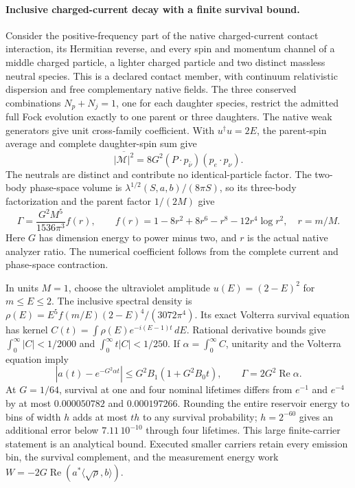 \paragraph{Inclusive charged-current decay with a finite survival bound.}
Consider the positive-frequency part of the native charged-current contact
interaction, its Hermitian reverse, and every spin and momentum channel of
a middle charged particle, a lighter charged particle and two distinct
massless neutral species. This is a declared contact member, with continuum
relativistic dispersion and free complementary native fields. The three
conserved combinations $N_p+N_j=1$, one for each daughter species, restrict
the admitted full Fock evolution exactly to one parent or three daughters.
The native weak generators give unit cross-family coefficient. With
$u^\dagger u=2E$, the parent-spin average and complete daughter-spin sum give
\[
 \overline{|\mathcal M|^2}
 =8G^2(P\cdot p_{\bar\nu})(p_e\cdot p_\nu).
\]
The neutrals are distinct and contribute no identical-particle factor.
The two-body phase-space volume is
$\lambda^{1/2}(S,a,b)/(8\pi S)$, so its three-body factorization and the
parent factor $1/(2M)$ give
\[
 \Gamma=\frac{G^2M^5}{1536\pi^3}f(r),\qquad
 f(r)=1-8r^2+8r^6-r^8-12r^4\log r^2,
 \quad r=m/M.
\]
Here $G$ has dimension energy to power minus two, and $r$ is the actual
native analyzer ratio. The numerical coefficient follows from the complete
current and phase-space contraction.

In units $M=1$, choose the ultraviolet amplitude $u(E)=(2-E)^2$ for
$m\leq E\leq2$. The inclusive spectral density is
$\rho(E)=E^5 f(m/E)(2-E)^4/(3072\pi^4)$. Its exact Volterra survival equation
has kernel $C(t)=\int\rho(E)e^{-i(E-1)t}\,dE$. Rational derivative bounds give
$\int_0^\infty|C|<1/2000$ and
$\int_0^\infty t|C|<1/250$. If
$\alpha=\int_0^\infty C$, unitarity and the Volterra equation imply
\[
 |a(t)-e^{-G^2\alpha t}|
 \leq G^2B_1(1+G^2B_0t),\qquad
 \Gamma=2G^2\operatorname{Re}\alpha.
\]
At $G=1/64$, survival at one and four nominal lifetimes differs from
$e^{-1}$ and $e^{-4}$ by at most $0.000050782$ and $0.000197266$.
Rounding the entire reservoir energy to bins of width $h$ adds at most
$th$ to any survival probability; $h=2^{-60}$ gives an additional error
below $7.11\,10^{-10}$ through four lifetimes. This large finite-carrier
statement is an analytical bound. Executed smaller carriers retain every
emission bin, the survival complement, and the measurement energy work
$W=-2G\operatorname{Re}(a^*\langle\sqrt\rho,b\rangle)$.

